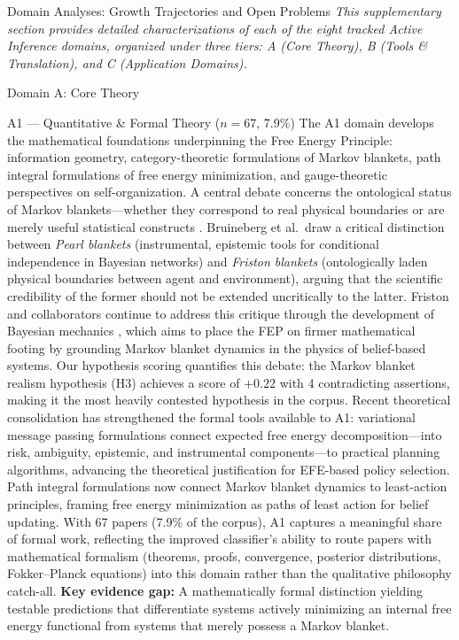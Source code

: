 \documentclass[
  ignorenonframetext,
]{beamer}
\author{\texorpdfstring{}{}}
\date{}
\begin{document}
\begin{frame}{Domain Analyses: Growth Trajectories and Open Problems
\label{sec:subfield_analyses}}
\protect{}\label{domain-analyses-growth-trajectories-and-open-problems}
\emph{This supplementary section provides detailed characterizations of
each of the eight tracked Active Inference domains, organized under
three tiers: A (Core Theory), B (Tools \& Translation), and C
(Application Domains).}

\begin{block}{Domain A: Core Theory}
\protect{}\label{domain-a-core-theory}
\begin{block}{A1 --- Quantitative \& Formal Theory (\(n = 67\), 7.9\%)}
\protect{}\label{a1-quantitative-formal-theory-n-67-7.9}
The A1 domain develops the mathematical foundations underpinning the
Free Energy Principle: information geometry, category-theoretic
formulations of Markov blankets, path integral formulations of free
energy minimization, and gauge-theoretic perspectives on
self-organization. A central debate concerns the ontological status of
Markov blankets---whether they correspond to real physical boundaries or
are merely useful statistical constructs \citep{bruineberg2022emperor}.
Bruineberg et al.~draw a critical distinction between \emph{Pearl
blankets} (instrumental, epistemic tools for conditional independence in
Bayesian networks) and \emph{Friston blankets} (ontologically laden
physical boundaries between agent and environment), arguing that the
scientific credibility of the former should not be extended uncritically
to the latter. Friston and collaborators continue to address this
critique through the development of Bayesian mechanics
\citep{sakthivadivel2023bayesian}, which aims to place the FEP on firmer
mathematical footing by grounding Markov blanket dynamics in the physics
of belief-based systems. Our hypothesis scoring quantifies this debate:
the Markov blanket realism hypothesis (H3) achieves a score of \(+0.22\)
with 4 contradicting assertions, making it the most heavily contested
hypothesis in the corpus. Recent theoretical consolidation has
strengthened the formal tools available to A1: variational message
passing formulations \citep{champion2021realizing} connect expected free
energy decomposition---into risk, ambiguity, epistemic, and instrumental
components---to practical planning algorithms, advancing the theoretical
justification for EFE-based policy selection. Path integral formulations
now connect Markov blanket dynamics to least-action principles, framing
free energy minimization as paths of least action for belief updating.
With 67 papers (7.9\% of the corpus), A1 captures a meaningful share of
formal work, reflecting the improved classifier's ability to route
papers with mathematical formalism (theorems, proofs, convergence,
posterior distributions, Fokker--Planck equations) into this domain
rather than the qualitative philosophy catch-all. \textbf{Key evidence
gap:} A mathematically formal distinction yielding testable predictions
that differentiate systems actively minimizing an internal free energy
functional from systems that merely possess a Markov blanket.
\end{block}


\end{block}
\end{frame}
\end{document}
